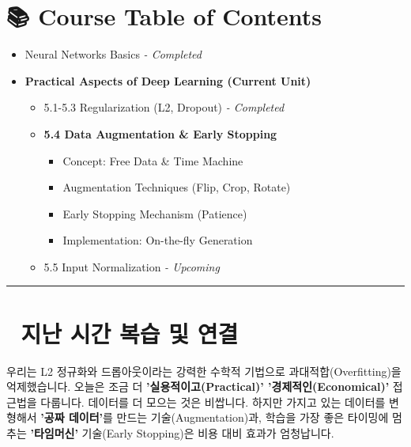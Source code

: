 \documentclass[11pt,a4paper]{book}
\theoremstyle{definition}
\begin{document}
\section*{📚 Course Table of Contents}
\begin{itemize}
    \item[Chapter 1-4.] Neural Networks Basics \textit{- Completed}
    \item[\textbf{Chapter 5.}] \textbf{Practical Aspects of Deep Learning (Current Unit)}
    \begin{itemize}
        \item 5.1-5.3 Regularization (L2, Dropout) \textit{- Completed}
        \item \textbf{5.4 Data Augmentation \& Early Stopping}
        \begin{itemize}
            \item Concept: Free Data \& Time Machine
            \item Augmentation Techniques (Flip, Crop, Rotate)
            \item Early Stopping Mechanism (Patience)
            \item Implementation: On-the-fly Generation
        \end{itemize}
        \item 5.5 Input Normalization \textit{- Upcoming}
    \end{itemize}
\end{itemize}

\vspace{0.5cm}
\hrule
\vspace{0.5cm}

\section*{🔗 지난 시간 복습 및 연결}
우리는 L2 정규화와 드롭아웃이라는 강력한 수학적 기법으로 과대적합(Overfitting)을 억제했습니다.
오늘은 조금 더 \textbf{'실용적이고(Practical)' '경제적인(Economical)'} 접근법을 다룹니다.
데이터를 더 모으는 것은 비쌉니다. 하지만 가지고 있는 데이터를 변형해서 \textbf{'공짜 데이터'}를 만드는 기술(Augmentation)과, 학습을 가장 좋은 타이밍에 멈추는 \textbf{'타임머신'} 기술(Early Stopping)은 비용 대비 효과가 엄청납니다.

\end{document}
